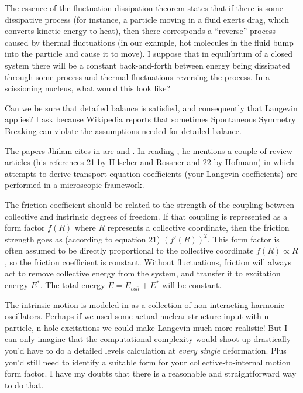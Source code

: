 The essence of the fluctuation-dissipation theorem states that if there is some dissipative process (for instance, a particle moving in a fluid exerts drag, which converts kinetic energy to heat), then there corresponds a ``reverse'' process caused by thermal fluctuations (in our example, hot molecules in the fluid bump into the particle and cause it to move). I suppose that in equilibrium of a closed system there will be a constant back-and-forth between energy being dissipated through some process and thermal fluctuations reversing the process. In a scissioning nucleus, what would this look like?

Can we be sure that detailed balance is satisfied, and consequently that Langevin applies? I ask because Wikipedia reports that sometimes Spontaneous Symmetry Breaking can violate the assumptions needed for detailed balance.

The papers Jhilam cites in \cite{Sadhukhan2016} are \cite{Frobrich1998} and \cite{Abe1996}. In reading \cite{Frobrich1998}, he mentions a couple of review articles (his references 21 by Hilscher and Rossner and 22 by Hofmann) in which attempts to derive transport equation coefficients (your Langevin coefficients) are performed in a microscopic framework.

The friction coefficient should be related to the strength of the coupling between collective and instrinsic degrees of freedom. If that coupling is represented as a form factor $f(R)$ where $R$ represents a collective coordinate, then the friction strength goes as (according to equation 21) $(f'(R))^2$. This form factor is often assumed to be directly proportional to the collective coordinate $f(R)\propto R$, so the friction coefficient is constant. Without fluctuations, friction will always act to remove collective energy from the system, and transfer it to excitation energy $E^*$. The total energy $E = E_{coll} + E^*$ will be constant.

The intrinsic motion is modeled in \cite{Frobrich1998} as a collection of non-interacting harmonic oscillators. Perhaps if we used some actual nuclear structure input with n-particle, n-hole excitations we could make Langevin much more realistic! But I can only imagine that the computational complexity would shoot up drastically - you'd have to do a detailed levels calculation at \textit{every single} deformation. Plus you'd still need to identify a suitable form for your collective-to-internal motion form factor. I have my doubts that there is a reasonable and straightforward way to do that.

